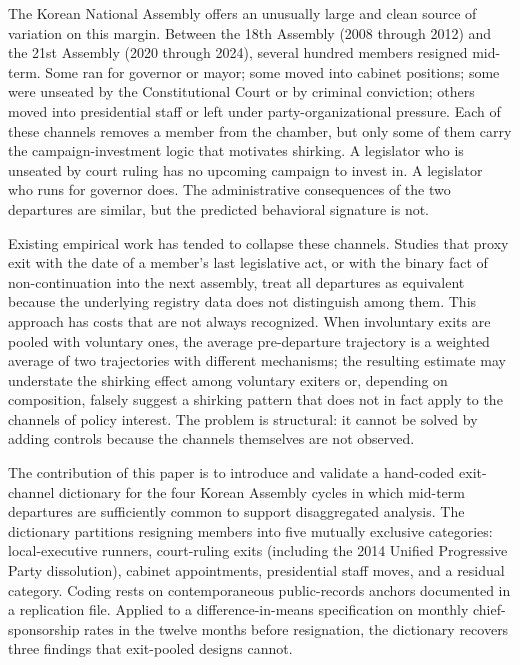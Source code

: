 \documentclass[11pt]{article}
\begin{document}
The Korean National Assembly offers an unusually large and clean source of variation on this margin. Between the 18th Assembly (2008 through 2012) and the 21st Assembly (2020 through 2024), several hundred members resigned mid-term. Some ran for governor or mayor; some moved into cabinet positions; some were unseated by the Constitutional Court or by criminal conviction; others moved into presidential staff or left under party-organizational pressure. Each of these channels removes a member from the chamber, but only some of them carry the campaign-investment logic that motivates shirking. A legislator who is unseated by court ruling has no upcoming campaign to invest in. A legislator who runs for governor does. The administrative consequences of the two departures are similar, but the predicted behavioral signature is not.

Existing empirical work has tended to collapse these channels. Studies that proxy exit with the date of a member's last legislative act, or with the binary fact of non-continuation into the next assembly, treat all departures as equivalent because the underlying registry data does not distinguish among them. This approach has costs that are not always recognized. When involuntary exits are pooled with voluntary ones, the average pre-departure trajectory is a weighted average of two trajectories with different mechanisms; the resulting estimate may understate the shirking effect among voluntary exiters or, depending on composition, falsely suggest a shirking pattern that does not in fact apply to the channels of policy interest. The problem is structural: it cannot be solved by adding controls because the channels themselves are not observed.

The contribution of this paper is to introduce and validate a hand-coded exit-channel dictionary for the four Korean Assembly cycles in which mid-term departures are sufficiently common to support disaggregated analysis. The dictionary partitions resigning members into five mutually exclusive categories: local-executive runners, court-ruling exits (including the 2014 Unified Progressive Party dissolution), cabinet appointments, presidential staff moves, and a residual category. Coding rests on contemporaneous public-records anchors documented in a replication file. Applied to a difference-in-means specification on monthly chief-sponsorship rates in the twelve months before resignation, the dictionary recovers three findings that exit-pooled designs cannot.
\end{document}
